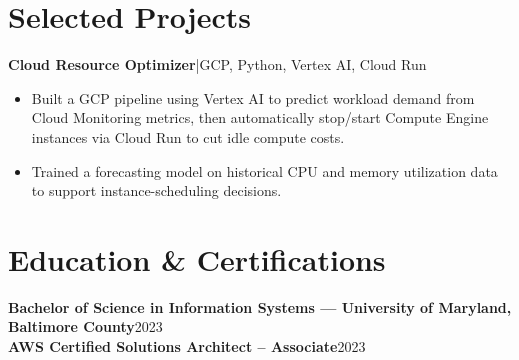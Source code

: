 \documentclass[9.5pt, letterpaper]{extarticle}
\newcommand{\projectheader}[2]{%
  \vspace{4pt}
  \noindent\textbf{#1}\enspace|\enspace#2
  \vspace{1pt}
}
\begin{document}
\section{Selected Projects}

\projectheader{Cloud Resource Optimizer}{GCP, Python, Vertex AI, Cloud Run}
\begin{itemize}
  \item Built a GCP pipeline using Vertex AI to predict workload demand from Cloud Monitoring metrics, then automatically stop/start Compute Engine instances via Cloud Run to cut idle compute costs.
  \item Trained a forecasting model on historical CPU and memory utilization data to support instance-scheduling decisions.
\end{itemize}

\section{Education \& Certifications}
\noindent\textbf{Bachelor of Science in Information Systems --- University of Maryland, Baltimore County}\hfill 2023\\
\textbf{AWS Certified Solutions Architect -- Associate}\hfill 2023
\end{document}

